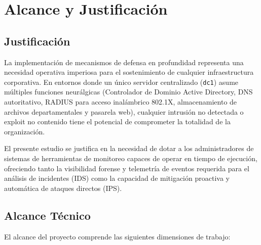 
\section{Alcance y Justificación}

\subsection{Justificación}

La implementación de mecanismos de defensa en profundidad representa una necesidad operativa imperiosa para el sostenimiento de cualquier infraestructura corporativa. En entornos donde un único servidor centralizado (\texttt{dc1}) asume múltiples funciones neurálgicas (Controlador de Dominio Active Directory, DNS autoritativo, RADIUS para acceso inalámbrico 802.1X, almacenamiento de archivos departamentales y pasarela web), cualquier intrusión no detectada o exploit no contenido tiene el potencial de comprometer la totalidad de la organización.

El presente estudio se justifica en la necesidad de dotar a los administradores de sistemas de herramientas de monitoreo capaces de operar en tiempo de ejecución, ofreciendo tanto la visibilidad forense y telemetría de eventos requerida para el análisis de incidentes (IDS) como la capacidad de mitigación proactiva y automática de ataques directos (IPS).

\subsection{Alcance Técnico}

El alcance del proyecto comprende las siguientes dimensiones de trabajo:

